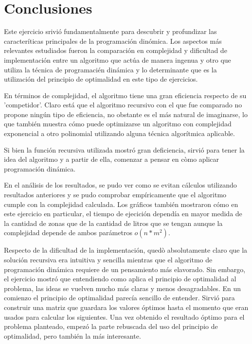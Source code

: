 \documentclass[a4paper,11pt] {article}
\begin{document}
\section*{Conclusiones}

Este ejercicio srivió fundamentalmente para descubrir y profundizar las caracteríticas principales de la programación dinómica.
Los aspectos más relevantes estudiados fueron la comparación en complejidad y dificultad de implementación entre un algoritmo que actúa de manera ingenua y otro que utiliza la técnica de programacién dinámica y lo determinante que es la utilización del principio de optimalidad en este tipo de ejercicios.

En términos de complejidad, el algoritmo tiene una gran eficiencia respecto de su 'competidor'. Claro está que el algoritmo recursivo con el que fue comparado no propone ningún tipo de eficiencia, no obstante es el más natural de imaginarse, lo que también muestra cómo puede optimizarse un algoritmo con complejidad exponencial a otro polinomial utilizando alguna técnica algorítmica aplicable.

Si bien la función recursiva utilizada mostró gran deficiencia, sirvió para tener la idea del algoritmo y a partir de ella, comenzar a pensar en còmo aplicar programación dinámica.

En el análisis de los resultados, se pudo ver como se evitan cálculos utilizando resultados anteriores y se pudo comprobar empíricamente que el algoritmo cumple con la complejidad calculada. Los gráficos también mostraron cómo en este ejercicio en particular, el tiempo de ejecición dependía en mayor medida de la cantidad de zonas que de la cantidad de litros que se tengan aunque la complejidad depende de ambos parámetros $o(n*m^2)$.

Respecto de la dificultad de la implementación, quedò absolutamente claro que la solución recursiva era intuitiva y sencilla mientras que el algoritmo de programación dinámica requiere de un pensamiento más elavorado. Sin embargo, el ejercicio mostró que entendiendo como aplica el principio de optimalidad al problema, las ideas se vuelven mucho más claras y menos desagradables.
En un comienzo el principio de optimalidad parecía sencillo de entender. Sirvió para construir una matriz que guardara los valores óptimos hasta el momento que eran usados para calcular los siguientes. Una vez obtenido el resultado óptimo para el problema planteado, empezó la parte rebuscada del uso del principio de optimalidad, pero también la más interesante.
\end{document}
